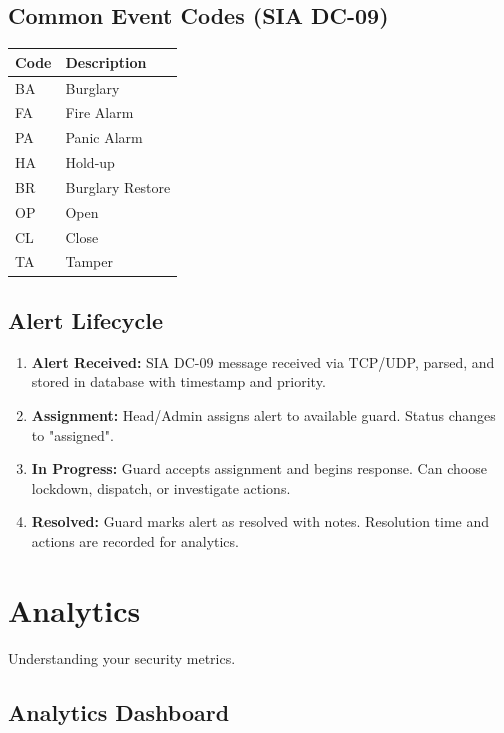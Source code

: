 \documentclass[12pt,a4paper]{article}
\begin{document}
\subsection{Common Event Codes (SIA DC-09)}

\begin{tabular}{|l|l|}
\hline
\textbf{Code} & \textbf{Description} \\
\hline
BA & Burglary \\
\hline
FA & Fire Alarm \\
\hline
PA & Panic Alarm \\
\hline
HA & Hold-up \\
\hline
BR & Burglary Restore \\
\hline
OP & Open \\
\hline
CL & Close \\
\hline
TA & Tamper \\
\hline
\end{tabular}

\subsection{Alert Lifecycle}

\begin{enumerate}
\item \textbf{Alert Received:} SIA DC-09 message received via TCP/UDP, parsed, and stored in database with timestamp and priority.
\item \textbf{Assignment:} Head/Admin assigns alert to available guard. Status changes to "assigned".
\item \textbf{In Progress:} Guard accepts assignment and begins response. Can choose lockdown, dispatch, or investigate actions.
\item \textbf{Resolved:} Guard marks alert as resolved with notes. Resolution time and actions are recorded for analytics.
\end{enumerate}

\section{Analytics}

Understanding your security metrics.

\subsection{Analytics Dashboard}
\end{document}
